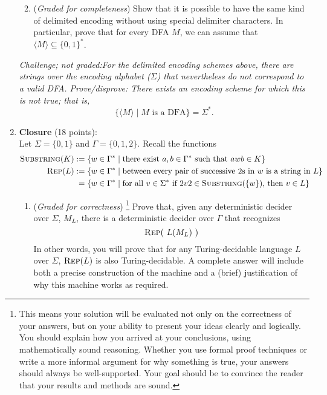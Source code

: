 \documentclass[12pt, oneside]{article}
\newcommand{\gradeCorrect}{({\it Graded for correctness}) }
\newcommand{\gradeCorrectFirst}{\gradeCorrect\footnote{This means your solution 
will be evaluated not only on the correctness of your answers, but on your ability
to present your ideas clearly and logically. You should explain how you 
arrived at your conclusions, using
mathematically sound reasoning. Whether you use formal proof techniques or 
write a more informal argument
for why something is true, your answers should always be well-supported. 
Your goal should be to convince the
reader that your results and methods are sound.} }
\newcommand{\gradeComplete}{({\it Graded for completeness}) }
\newcommand{\SUBSTRING}{\textsc{Substring}}
\newcommand{\REP}{\textsc{Rep}}
\begin{document}
\begin{enumerate}
\begin{enumerate}
\begin{center}
\end{center}

\item\gradeComplete Show that it is possible to have the same kind of delimited encoding without 
using special delimiter characters. In particular, prove that for every DFA $M$, 
we can assume that $\langle M \rangle \subseteq \{0,1\}^*$.

\end{enumerate}

\noindent\textit{Challenge; not graded:\newline For the delimited encoding schemes above, 
there are strings over the encoding alphabet 
($\Sigma$) that nevertheless do not correspond to a valid DFA. \newline \newline
Prove/disprove: There exists an encoding scheme for which this is not true; that is, 
\[\{ \langle M \rangle \mid M \text{ is a DFA}\} = \Sigma^*.\]}

\vfill



\item \textbf{Closure} (18 points): \\
Let $\Sigma = \{0,1\}$ and $\Gamma = \{0,1,2\}$. Recall the functions
    \begin{align*}
    \SUBSTRING(K) &:= \{ w \in \Gamma^* \mid \text{there exist } a,b \in \Gamma^* \text{ such that } awb \in K\} \\
    \REP(L) &:= \{ w \in \Gamma^* \mid \text{between every 
    pair of successive $2$s in $w$ is a string in $L$}\}\\
    &\phantom{:}=\{w \in \Gamma^* \mid \text{for all } v \in \Sigma^* \text{ if } 2v2 \in \SUBSTRING(\{w\})  \text{, then } v \in L\}
    \end{align*}
\begin{enumerate}
    \item\gradeCorrectFirst Prove that, given any deterministic decider
    over $\Sigma$, $M_L$, there is a deterministic decider over 
    $\Gamma$ that recognizes $$\REP(~L(M_L)~)$$
    In other words, you 
    will prove that for any Turing-decidable language $L$ over $\Sigma$, 
    $\REP(L)$
    is also Turing-decidable. A complete answer will 
    include both a precise construction of the machine and a 
    (brief) justification of why this machine works as required.
    

\end{enumerate}
\end{enumerate}
\end{document}
